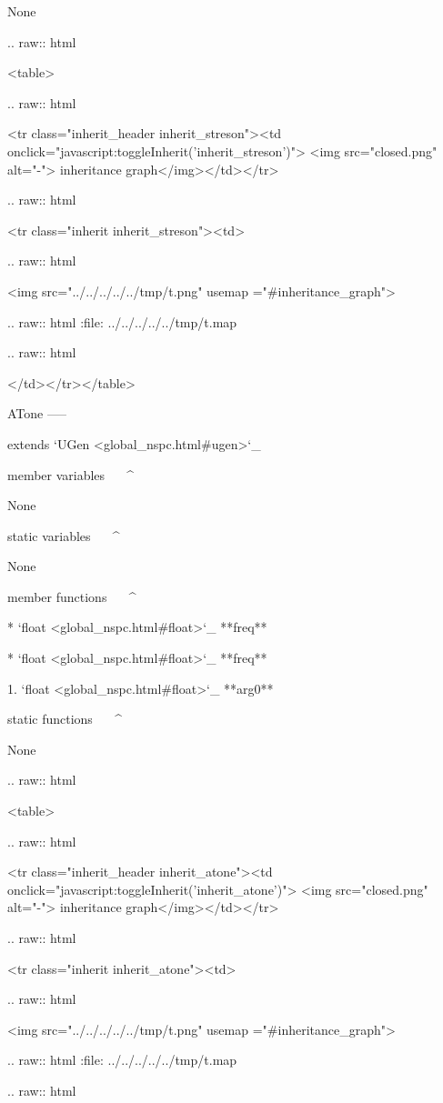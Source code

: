 	None


  .. raw:: html

   <table>


  .. raw:: html

   <tr class="inherit_header inherit_streson"><td onclick="javascript:toggleInherit('inherit_streson')"> <img src="closed.png" alt="-"> inheritance graph</img></td></tr>


  .. raw:: html

   <tr class="inherit inherit_streson"><td>


  .. raw:: html

   <img src="../../../../../tmp/t.png" usemap ="#inheritance_graph">


  .. raw:: html
   :file:   ../../../../../tmp/t.map


  .. raw:: html

   </td></tr></table>

ATone
-----

extends `UGen <global_nspc.html#ugen>`_ 

member variables
^^^^^^^^^^^^^^^^

	None

static variables
^^^^^^^^^^^^^^^^

	None

member functions
^^^^^^^^^^^^^^^^

	* `float <global_nspc.html#float>`_ **freq**

	* `float <global_nspc.html#float>`_ **freq**

		1. `float <global_nspc.html#float>`_ **arg0**

static functions
^^^^^^^^^^^^^^^^


	None


  .. raw:: html

   <table>


  .. raw:: html

   <tr class="inherit_header inherit_atone"><td onclick="javascript:toggleInherit('inherit_atone')"> <img src="closed.png" alt="-"> inheritance graph</img></td></tr>


  .. raw:: html

   <tr class="inherit inherit_atone"><td>


  .. raw:: html

   <img src="../../../../../tmp/t.png" usemap ="#inheritance_graph">


  .. raw:: html
   :file:   ../../../../../tmp/t.map


  .. raw:: html

